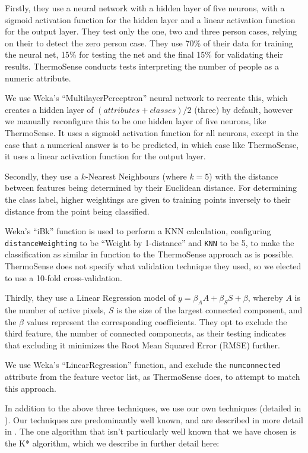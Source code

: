 \documentclass[../thesis/thesis.tex]{subfiles}
\begin{document}
Firstly, they use a neural network with a hidden layer of five neurons, with a sigmoid activation function for the hidden layer and a linear activation function for the output layer. They test only the one, two and three person cases, relying on their \pir to detect the zero person case. They use 70\% of their data for training the neural net, 15\% for testing the net and the final 15\% for validating their results. ThermoSense conducts tests interpreting the number of people as a numeric attribute.

We use Weka's ``MultilayerPerceptron'' neural network to recreate this, which creates a hidden layer of $(\mathit{attributes} + \mathit{classes}) / 2$ (three) by default, however we manually reconfigure this to be one hidden layer of five neurons, like ThermoSense. It uses a sigmoid activation function for all neurons, except in the case that a numerical answer is to be predicted, in which case like ThermoSense, it uses a linear activation function for the output layer.

Secondly, they use a $k$-Nearest Neighbours (where $k=5$) with the distance between features being determined by their Euclidean distance. For determining the class label, higher weightings are given to training points inversely to their distance from the point being classified.

Weka's ``iBk'' function is used to perform a KNN calculation, configuring \texttt{distanceWeighting} to be ``Weight by 1-distance'' and \texttt{KNN} to be 5, to make the classification as similar in function to the ThermoSense approach as is possible. ThermoSense does not specify what validation technique they used, so we elected to use a 10-fold cross-validation.

Thirdly, they use a Linear Regression model of $y = \beta_A A + \beta_S S + \beta $, whereby $A$ is the number of active pixels, $S$ is the size of the largest connected component, and the $\beta$ values represent the corresponding coefficients. They opt to exclude the third feature, the number of connected components, as their testing indicates that excluding it minimizes the Root Mean Squared Error (RMSE) further. 

We use Weka's ``LinearRegression'' function, and exclude the \texttt{numconnected} attribute from the feature vector list, as ThermoSense does, to attempt to match this approach.

In addition to the above three techniques, we use our own techniques (detailed in ). Our techniques are predominantly well known, and are described in more detail in . The one algorithm that isn't particularly well known that we have chosen is the K* algorithm, which we describe in further detail here:
\end{document}
